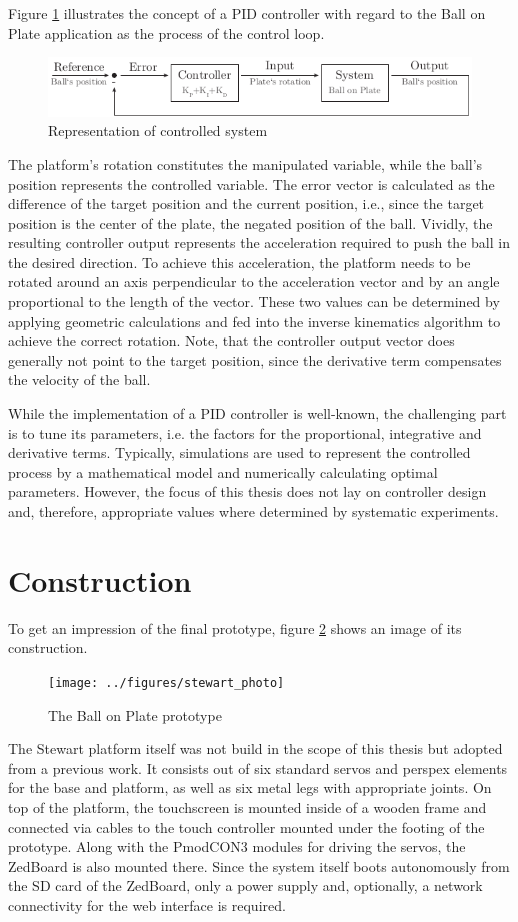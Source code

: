 Figure \ref{fig:pid_rep} illustrates the concept of a \ac{PID} controller with
regard to the Ball on Plate application as the process of the control loop.
\begin{figure}
	\centering
	\centering
	\includegraphics{../figures/pid_rep}
	\caption{Representation of controlled system}
	\label{fig:pid_rep}
\end{figure}
The platform's rotation constitutes the manipulated variable, while the ball's
position represents the controlled variable. The error vector is calculated as
the difference of the target position and the current position, i.e., since
the target position is the center of the plate, the negated position of the
ball. Vividly, the resulting controller output represents the acceleration
required to push the ball in the desired direction. To achieve this
acceleration, the platform needs to be rotated around an axis perpendicular to
the acceleration vector and by an angle proportional to the length of the
vector. These two values can be determined by applying geometric calculations
and fed into the inverse kinematics algorithm to achieve the correct rotation.
Note, that the controller output vector does generally not point to the target
position, since the derivative term compensates the velocity of the ball.

While the implementation of a \ac{PID} controller is well-known, the
challenging part is to tune its parameters, i.e. the factors for the
proportional, integrative and derivative terms. Typically, simulations are
used to represent the controlled process by a mathematical model and
numerically calculating optimal parameters. However, the focus of this thesis
does not lay on controller design and, therefore, appropriate values where
determined by systematic experiments.

\section{Construction}
To get an impression of the final prototype, figure \ref{fig:stewart_photo}
shows an image of its construction.
\begin{figure}
	\centering
	\texttt{[image: ../figures/stewart\_photo]}
	\caption{The Ball on Plate prototype}
	\label{fig:stewart_photo}
\end{figure}
The Stewart platform itself was not build in the scope of this thesis but
adopted from a previous work. It consists out of six standard servos and
perspex elements for the base and platform, as well as six metal legs with
appropriate joints. On top of the platform, the touchscreen is mounted inside
of a wooden frame and connected via cables to the touch controller mounted
under the footing of the prototype. Along with the PmodCON3 modules for
driving the servos, the ZedBoard is also mounted there. Since the system
itself boots autonomously from the SD card of the ZedBoard, only a power
supply and, optionally, a network connectivity for the web interface is required.

